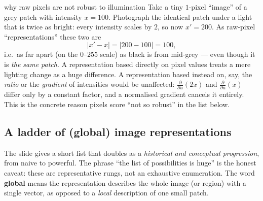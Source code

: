 \documentclass{report}
\begin{document}
\begin{exbox}{why raw pixels are not robust to illumination}
Take a tiny $1$-pixel ``image'' of a grey patch with intensity $x = 100$.
Photograph the identical patch under a light that is twice as bright: every
intensity scales by $2$, so now $x' = 200$. As raw-pixel ``representations''
these two are
\[
|x' - x| = |200 - 100| = 100,
\]
i.e.\ as far apart (on the $0$--$255$ scale) as black is from mid-grey ---
even though it is \emph{the same patch}. A representation based directly on
pixel values treats a mere lighting change as a huge difference. A
representation based instead on, say, the \emph{ratio} or the \emph{gradient}
of intensities would be unaffected: $\tfrac{\partial}{\partial u}(2x)$ and
$\tfrac{\partial}{\partial u}(x)$ differ only by a constant factor, and a
normalised gradient cancels it entirely. This is the concrete reason pixels
score ``not so robust'' in the list below.
\end{exbox}

\subsection{A ladder of (global) image representations}

The slide gives a short list that doubles as a \emph{historical and conceptual
progression}, from naive to powerful. The phrase ``the list of possibilities
is huge'' is the honest caveat: these are representative rungs, not an
exhaustive enumeration. The word \textbf{global} means the representation
describes the whole image (or region) with a single vector, as opposed to a
\emph{local} description of one small patch.
\end{document}
